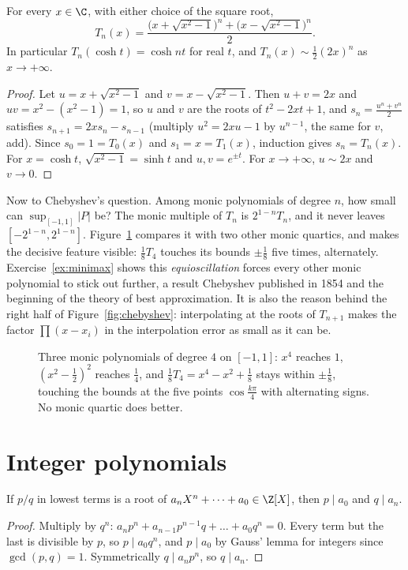 \begin{propositionx}
For every $x\in\C$, with either choice of the square root,
\[
T_n(x)=\frac{\bigl(x+\sqrt{x^2-1}\bigr)^n+\bigl(x-\sqrt{x^2-1}\bigr)^n}2.
\]
In particular $T_n(\cosh t)=\cosh nt$ for real $t$, and $T_n(x)\sim\frac12(2x)^n$ as $x\to+\infty$.
\end{propositionx}
\begin{proof}
Let $u=x+\sqrt{x^2-1}$ and $v=x-\sqrt{x^2-1}$. Then $u+v=2x$ and $uv=x^2-(x^2-1)=1$, so $u$ and $v$ are the roots of $t^2-2xt+1$, and
$s_n=\frac{u^n+v^n}2$ satisfies $s_{n+1}=2xs_n-s_{n-1}$ (multiply $u^2=2xu-1$ by $u^{n-1}$, the same for $v$, add). Since $s_0=1=T_0(x)$ and
$s_1=x=T_1(x)$, induction gives $s_n=T_n(x)$. For $x=\cosh t$, $\sqrt{x^2-1}=\sinh t$ and $u,v=e^{\pm t}$. For $x\to+\infty$, $u\sim2x$ and $v\to0$.
\end{proof}

Now to Chebyshev's question. Among monic polynomials of degree $n$, how small can $\sup_{[-1,1]}|P|$ be? The monic multiple of $T_n$ is
$2^{1-n}T_n$, and it never leaves $[-2^{1-n},2^{1-n}]$. Figure~\ref{fig:equioscillation} compares it with two other monic quartics, and makes the
decisive feature visible: $\frac18T_4$ touches its bounds $\pm\frac18$ five times, alternately. Exercise~\ref{ex:minimax} shows this
\emph{equioscillation} forces every other monic polynomial to stick out further, a result Chebyshev published in 1854 and the beginning of the
theory of best approximation. It is also the reason behind the right half of Figure~\ref{fig:chebyshev}: interpolating at the roots of $T_{n+1}$
makes the factor $\prod(x-x_i)$ in the interpolation error as small as it can be.

\begin{figure}[ht]
\centering
{}
\caption{Three monic polynomials of degree $4$ on $[-1,1]$: $x^4$ reaches $1$, $(x^2-\frac12)^2$ reaches $\frac14$, and $\frac18T_4=x^4-x^2+\frac18$ stays within $\pm\frac18$, touching the bounds at the five points $\cos\frac{k\pi}4$ with alternating signs. No monic quartic does better.}
\label{fig:equioscillation}
\end{figure}

\section{Integer polynomials}

\begin{proposition}\label{prop:ratroot}
If $p/q$ in lowest terms is a root of $a_nX^n+\dots+a_0\in\Z[X]$, then $p\mid a_0$ and $q\mid a_n$.
\end{proposition}
\begin{proof}
Multiply by $q^n$: $a_np^n+a_{n-1}p^{n-1}q+\dots+a_0q^n=0$. Every term but the last is divisible by $p$, so $p\mid a_0q^n$, and $p\mid a_0$ by Gauss' lemma for integers since $\gcd(p,q)=1$. Symmetrically $q\mid a_np^n$, so $q\mid a_n$.
\end{proof}

